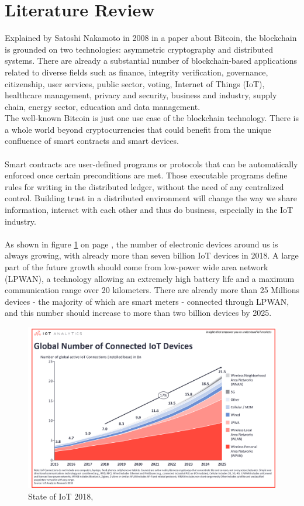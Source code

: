 \documentclass[11pt]{article}
\begin{document}
\section{Literature Review}
Explained by Satoshi Nakamoto in 2008 in a paper about Bitcoin, the blockchain is grounded on two technologies: asymmetric cryptography and distributed systems. There are already a substantial number of blockchain-based applications related to diverse fields such as finance, integrity verification, governance, citizenship, user services, public sector, voting, Internet of Things (IoT), healthcare management, privacy and security, business and industry, supply chain, energy sector, education and data management.\cite{1} \\
The well-known Bitcoin is just one use case of the blockchain technology. There is a whole world beyond cryptocurrencies that could benefit from the unique confluence of smart contracts and smart devices.\\\\
Smart contracts are user-defined programs or protocols that can be automatically enforced once certain preconditions are met. Those executable programs define rules for writing in the distributed ledger, without the need of any centralized control. Building trust in a distributed environment will change the way we share information, interact with each other and thus do business, especially in the IoT industry.\cite{2}\\\\
As shown in figure \ref{img_state} on page \pageref{img_state}, the number of electronic devices around us is always growing, with already more than seven billion IoT devices in 2018. A large part of the future growth should come from low-power wide area network (LPWAN), a technology allowing an extremely high battery life and a maximum communication range over 20 kilometers. There are already more than 25 Millions devices - the majority of which are smart meters - connected through LPWAN, and this number should increase to more than two billion devices by 2025.\\

\begin{figure}[H]
	\begin{center}
		\includegraphics[scale=0.275]{stateofIoT2018.png}
		\caption{State of IoT 2018, \cite{3}}
		\label{img_state}
	\end{center}
\end{figure}
\end{document}
